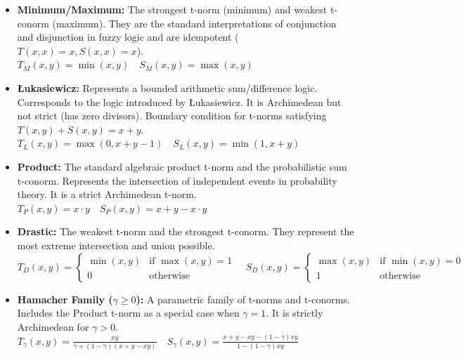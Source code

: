 \begin{example}
  \begin{itemize}
    \item \textbf{Minimum/Maximum:} 
    The strongest t-norm (minimum) and weakest t-conorm (maximum). They are the standard interpretations of conjunction and disjunction in fuzzy logic and are idempotent ($T(x,x)=x, S(x,x)=x$).\\
    $T_M(x, y) = \min(x, y) \quad S_M(x, y) = \max(x, y)$

    \item \textbf{Łukasiewicz:}
    Represents a bounded arithmetic sum/difference logic. Corresponds to the logic introduced by Łukasiewicz. It is Archimedean but not strict (has zero divisors). Boundary condition for t-norms satisfying $T(x,y)+S(x,y) = x+y$. \\
    $T_L(x, y) = \max(0, x + y - 1) \quad S_L(x, y) = \min(1, x + y)$

    \item \textbf{Product:}
    The standard algebraic product t-norm and the probabilistic sum t-conorm. Represents the intersection of independent events in probability theory. It is a strict Archimedean t-norm. \\
    $T_P(x, y) = x \cdot y \quad S_P(x, y) = x + y - x \cdot y$

    \item \textbf{Drastic:}
    The weakest t-norm and the strongest t-conorm. They represent the most extreme intersection and union possible.  \\
    $T_D(x, y) = \begin{cases} \min(x,y) & \text{if } \max(x,y)=1 \\ 0 & \text{otherwise} \end{cases} \quad S_D(x, y) = \begin{cases} \max(x,y) & \text{if } \min(x,y)=0 \\ 1 & \text{otherwise} \end{cases}$

    \item \textbf{Hamacher Family ($\gamma \ge 0$):}
    A parametric family of t-norms and t-conorms. Includes the Product t-norm as a special case when $\gamma = 1$. It is strictly Archimedean for $\gamma > 0$. \\
    $T_\gamma(x, y) = \frac{xy}{\gamma + (1-\gamma)(x+y-xy)} \quad S_\gamma(x, y) = \frac{x+y-xy-(1-\gamma)xy}{1-(1-\gamma)xy}$


\end{itemize}
\end{example}
